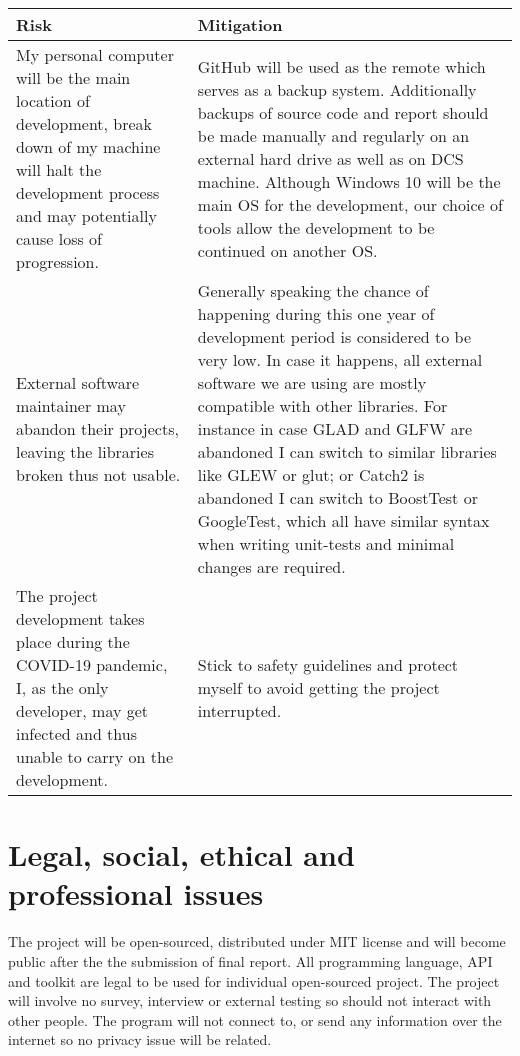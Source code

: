 \documentclass[oneside, a4paper]{article}
\begin{document}
    \begin{center}
        \begin{tabular}{ | p{7.5cm} || p{7.5cm} | }
            \hline
            Risk & Mitigation \\
            \hline
            \hline
            My personal computer will be the main location of development, break down of my machine will halt the development process and may potentially cause loss of progression. & 
            GitHub will be used as the remote which serves as a backup system. Additionally backups of source code and report should be made manually and regularly on an external hard drive as well as on DCS machine. Although Windows 10 will be the main OS for the development, our choice of tools allow the development to be continued on another OS. \\
            \hline
            External software maintainer may abandon their projects, leaving the libraries broken thus not usable. &
            Generally speaking the chance of happening during this one year of development period is considered to be very low. In case it happens, all external software we are using are mostly compatible with other libraries. For instance in case GLAD and GLFW are abandoned I can switch to similar libraries like GLEW or glut; or Catch2 is abandoned I can switch to BoostTest or GoogleTest, which all have similar syntax when writing unit-tests and minimal changes are required. \\
            \hline
            The project development takes place during the COVID-19 pandemic, I, as the only developer, may get infected and thus unable to carry on the development. &
            Stick to safety guidelines and protect myself to avoid getting the project interrupted. \\
            \hline
        \end{tabular}
    \end{center}

    \section{Legal, social, ethical and professional issues}
    The project will be open-sourced, distributed under MIT license and will become public after the the submission of final report. All programming language, API and toolkit are legal to be used for individual open-sourced project. The project will involve no survey, interview or external testing so should not interact with other people. The program will not connect to, or send any information over the internet so no privacy issue will be related.
\end{document}
